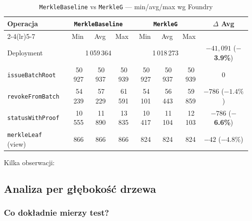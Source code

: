 \documentclass[11pt,a4paper]{article}
\begin{document}
\begin{table}[H]
\centering
\caption{\texttt{MerkleBaseline} vs \texttt{MerkleG} --- min/avg/max wg Foundry}
\begin{tabular}{lrrrrrrc}
\toprule
Operacja
  & \multicolumn{3}{c}{\texttt{MerkleBaseline}}
  & \multicolumn{3}{c}{\texttt{MerkleG}}
  & $\Delta$ Avg \\
\cmidrule(lr){2-4}\cmidrule(lr){5-7}
& Min & Avg & Max & Min & Avg & Max & \\
\midrule
Deployment
  & \multicolumn{3}{c}{1\,059\,364}
  & \multicolumn{3}{c}{1\,018\,273}
  & $-41{,}091$ (\textbf{$-$3.9\%}) \\
\texttt{issueBatchRoot}
  & 50\,927 & 50\,937 & 50\,939
  & 50\,927 & 50\,937 & 50\,939
  & $0$ \\
\texttt{revokeFromBatch}
  & 54\,239 & 57\,229 & 61\,591
  & 54\,101 & 56\,443 & 59\,859
  & $-786$ ($-1.4\%$) \\
\texttt{statusWithProof}
  & 10\,555 & 11\,890 & 13\,835
  & 10\,417 & 11\,104 & 12\,103
  & $-786$ (\textbf{$-$6.6\%}) \\
\texttt{merkleLeaf} (view)
  & 866 & 866 & 866
  & 824 & 824 & 824
  & $-42$ ($-4.8\%$) \\
\bottomrule
\end{tabular}
\end{table}

\noindent Kilka obserwacji:

\subsection{Analiza per głębokość drzewa}

\subsubsection*{Co dokładnie mierzy test?}
\end{document}
